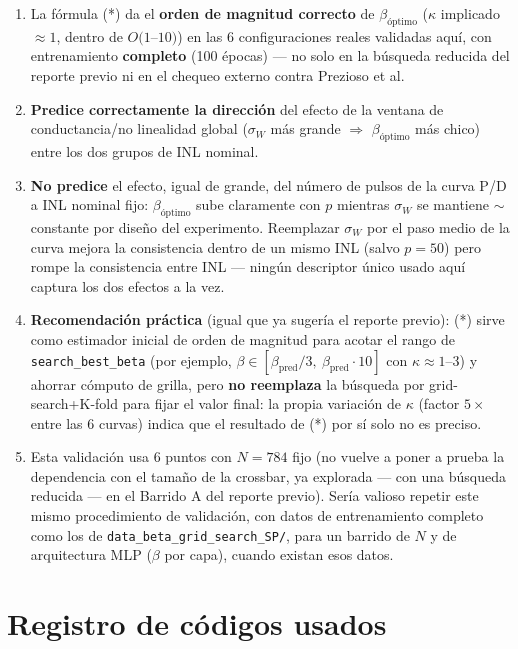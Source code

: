 \documentclass[11pt]{article}
\begin{document}
\begin{enumerate}
\item La fórmula (*) da el \textbf{orden de magnitud correcto} de
  $\beta_{\text{óptimo}}$ ($\kappa$ implicado $\approx1$, dentro de
  $O(1$--$10)$) en las 6 configuraciones reales validadas aquí, con
  entrenamiento \textbf{completo} (100 épocas) --- no solo en la búsqueda
  reducida del reporte previo ni en el chequeo externo contra Prezioso et
  al.
\item \textbf{Predice correctamente la dirección} del efecto de la ventana
  de conductancia/no linealidad global ($\sigma_W$ más grande $\Rightarrow$
  $\beta_{\text{óptimo}}$ más chico) entre los dos grupos de INL nominal.
\item \textbf{No predice} el efecto, igual de grande, del número de pulsos
  de la curva P/D a INL nominal fijo: $\beta_{\text{óptimo}}$ sube
  claramente con $p$ mientras $\sigma_W$ se mantiene ${\sim}$constante por
  diseño del experimento. Reemplazar $\sigma_W$ por el paso medio de la
  curva mejora la consistencia dentro de un mismo INL (salvo $p=50$) pero
  rompe la consistencia entre INL --- ningún descriptor único usado aquí
  captura los dos efectos a la vez.
\item \textbf{Recomendación práctica} (igual que ya sugería el reporte
  previo): (*) sirve como estimador inicial de orden de magnitud para
  acotar el rango de \texttt{search\_best\_beta} (por ejemplo,
  $\beta\in[\beta_{\mathrm{pred}}/3,\ \beta_{\mathrm{pred}}\cdot10]$ con
  $\kappa\approx1$--$3$) y ahorrar cómputo de grilla, pero \textbf{no
  reemplaza} la búsqueda por grid-search+K-fold para fijar el valor final:
  la propia variación de $\kappa$ (factor $5\times$ entre las 6 curvas)
  indica que el resultado de (*) por sí solo no es preciso.
\item Esta validación usa 6 puntos con $N=784$ fijo (no vuelve a poner a
  prueba la dependencia con el tamaño de la crossbar, ya explorada --- con
  una búsqueda reducida --- en el Barrido A del reporte previo). Sería
  valioso repetir este mismo procedimiento de validación, con datos de
  entrenamiento completo como los de \texttt{data\_beta\_grid\_search\_SP/},
  para un barrido de $N$ y de arquitectura MLP ($\beta$ por capa), cuando
  existan esos datos.
\end{enumerate}

\section{Registro de códigos usados}
\label{sec:registro}
\end{document}
